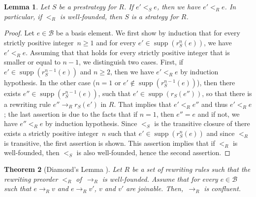 \documentclass[11pt]{article}
\newtheorem{theorem}{Theorem}[section]
\newtheorem{lemma}[theorem]{Lemma}
\theoremstyle{definition}
\newcommand\basis{\mathscr{B}}
\newcommand\ordS{<_S}
\newcommand\ordR{<_R}
\DeclareMathOperator{\supp}{supp}
\newcommand\rewR{\to_R}
\begin{document}
\begin{lemma}\label{lem:rew_preorder}
  Let $S$ be a prestrategy for $R$. If $e'\ordS e$, then we have
  $e'\ordR e$. In particular, if $\ordR$ is well-founded, then $S$ is a
  strategy for $R$.
\end{lemma}


\begin{proof}
  Let $e\in\basis$ be a basis element. We first show by induction that
  for every strictly positive integer~$n\geq 1$ and for every
  $e'\in\supp(r_S^n(e))$, we have $e'\ordR e$. Assuming that that holds
  for every strictly positive integer that is smaller or equal to $n-1$,
  we distinguish two cases. First, if $e'\in\supp(r_S^{n-1}(e))$ and
  $n\geq 2$, then we have $e'<_Re$ by induction hypothesis. In the other
  case ($n=1$ or $e'\notin\supp(r_S^{n-1}(e))$), then there exists
  $e''\in\supp(r_S^{n-1}(e))$, such that $e'\in\supp(r_S(e''))$, so that
  there is a rewriting rule $e''\rewR r_S(e')$ in $R$. That implies that
  $e'<_Re''$ and thus $e'<_Re$; the last assertion is due to the facts
  that if $n=1$, then $e''=e$ and if not, we have $e''<_Re$ by induction
  hypothesis. Since $\ordS$ is the transitive closure of there exists a
  strictly positive integer~$n$ such that $e'\in\supp(r_S^n(e))$ and
  since $\ordR$ is transitive, the first assertion is shown. This
  assertion implies that if $\ordR$ is well-founded, then $\ordS$ is also
  well-founded, hence the second assertion.
\end{proof}
\smallskip

\begin{theorem}[Diamond's Lemma \cite{MR506890}]
  \label{thm:diamond_lemma}
  Let $R$ be a set of rewriting rules such that the rewriting preorder
  $\ordR$ of~$\rewR$ is well-founded. Assume that  for every $e\in\basis$
  such that $e\rewR v$ and $e\rewR v'$, $v$ and $v'$ are joinable. 
  Then,~$\rewR$ is confluent.
\end{theorem}
\end{document}
